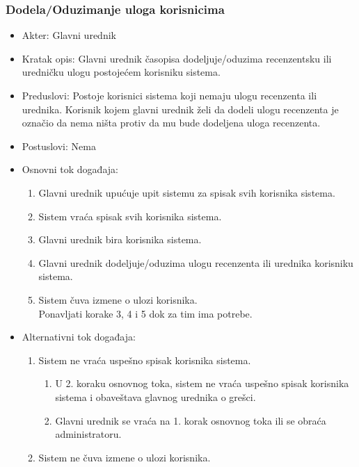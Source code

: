 \documentclass[a4paper]{article}
\begin{document}
\subsubsection{Dodela/Oduzimanje uloga korisnicima}
\label{subsubsection:ulogesec}
\begin{itemize}
    \item Akter: Glavni urednik
    \item Kratak opis: Glavni urednik časopisa dodeljuje/oduzima recenzentsku ili uredničku ulogu postojećem korisniku sistema.
    \item Preduslovi: Postoje korisnici sistema koji nemaju ulogu recenzenta ili urednika. Korisnik kojem glavni urednik želi da dodeli ulogu recenzenta je označio da nema ništa protiv da mu bude dodeljena uloga recenzenta. 
    \item Postuslovi: Nema
    \item Osnovni tok događaja:
        \begin{enumerate}
            \item Glavni urednik upućuje upit sistemu za spisak svih korisnika sistema.
            \item Sistem vraća spisak svih korisnika sistema.
            \item Glavni urednik bira korisnika sistema.
            \item Glavni urednik dodeljuje/oduzima ulogu recenzenta ili urednika korisniku sistema.
            \item Sistem čuva izmene o ulozi korisnika.\\
            Ponavljati korake 3, 4 i 5 dok za tim ima potrebe.
        \end{enumerate}
    \item Alternativni tok događaja:
        \begin{enumerate}
            \item Sistem ne vraća uspešno spisak korisnika sistema.
            \begin{enumerate}
                \item U 2. koraku osnovnog toka, sistem ne vraća uspešno spisak korisnika sistema i obaveštava glavnog urednika o grešci.
                \item Glavni urednik se vraća na 1. korak osnovnog toka ili se obraća administratoru.
            \end{enumerate}
            \item Sistem ne čuva izmene o ulozi korisnika.
            \begin{enumerate}

\end{enumerate}
\end{enumerate}
\end{itemize}
\end{document}
